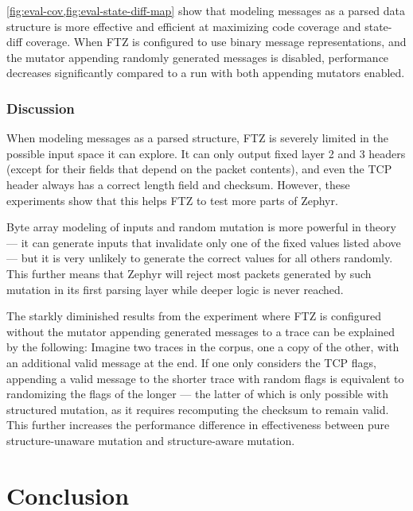 \documentclass[twocolumn]{article}
\newcommand{\proj}{FTZ\xspace}
\begin{document}
\cref{fig:eval-cov,fig:eval-state-diff-map} show that modeling messages as a parsed data structure is more effective and efficient at maximizing code coverage and state-diff coverage. When \proj is configured to use binary message representations, and the mutator appending randomly generated messages is disabled, performance decreases significantly compared to a run with both appending mutators enabled.

\subsubsection*{Discussion}

When modeling messages as a parsed structure, \proj is severely limited in the possible input space it can explore. It can only output fixed layer 2 and 3 headers (except for their fields that depend on the packet contents), and even the TCP header always has a correct length field and checksum. However, these experiments show that this helps \proj to test more parts of Zephyr.

Byte array modeling of inputs and random mutation is more powerful in theory — it can generate inputs that invalidate only one of the fixed values listed above — but it is very unlikely to generate the correct values for all others randomly. This further means that Zephyr will reject most packets generated by such mutation in its first parsing layer while deeper logic is never reached.

The starkly diminished results from the experiment where \proj is configured without the mutator appending generated messages to a trace can be explained by the following: Imagine two traces in the corpus, one a copy of the other, with an additional valid message at the end. If one only considers the TCP flags, appending a valid message to the shorter trace with random flags is equivalent to randomizing the flags of the longer — the latter of which is only possible with structured mutation, as it requires recomputing the checksum to remain valid. This further increases the performance difference in effectiveness between pure structure-unaware mutation and structure-aware mutation.


\section{Conclusion}
\label{Conclusion}
\end{document}
